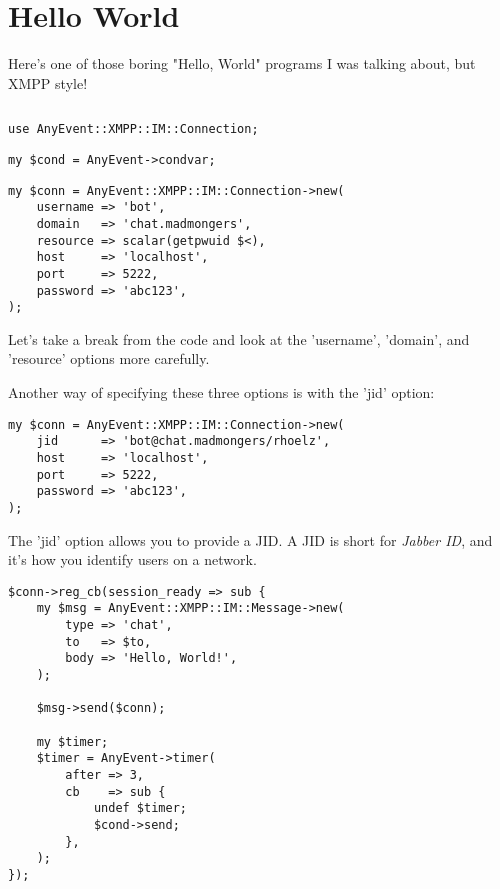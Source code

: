 \section*{Hello World}

Here's one of those boring "Hello, World" programs I was talking about, but XMPP style!

\begin{shaded}
\inputminted{perl}{examples/hello.pl}
\end{shaded}
\pause

\begin{shaded}
\begin{verbatim}
use AnyEvent::XMPP::IM::Connection;
\end{verbatim}
\end{shaded}

\pause
\begin{shaded}
\begin{verbatim}
my $cond = AnyEvent->condvar;
\end{verbatim}
\end{shaded}

\newpage
\begin{shaded}
\begin{verbatim}
my $conn = AnyEvent::XMPP::IM::Connection->new(
    username => 'bot',
    domain   => 'chat.madmongers',
    resource => scalar(getpwuid $<),
    host     => 'localhost',
    port     => 5222,
    password => 'abc123',
);
\end{verbatim}
\end{shaded}

\pause
Let's take a break from the code and look at the 'username', 'domain', and
'resource' options more carefully.

\pause
Another way of specifying these three options is with the 'jid' option:

\begin{shaded}
\begin{verbatim}
my $conn = AnyEvent::XMPP::IM::Connection->new(
    jid      => 'bot@chat.madmongers/rhoelz',
    host     => 'localhost',
    port     => 5222,
    password => 'abc123',
);
\end{verbatim}
\end{shaded}

\pause
The 'jid' option allows you to provide a JID.  A JID is short for \textit{Jabber ID}, and it's how
you identify users on a network.

\pause
\begin{shaded}
\begin{verbatim}
$conn->reg_cb(session_ready => sub {
    my $msg = AnyEvent::XMPP::IM::Message->new(
        type => 'chat',
        to   => $to,
        body => 'Hello, World!',
    );

    $msg->send($conn);

    my $timer;
    $timer = AnyEvent->timer(
        after => 3,
        cb    => sub {
            undef $timer;
            $cond->send;
        },
    );
});
\end{verbatim}
\end{shaded}

